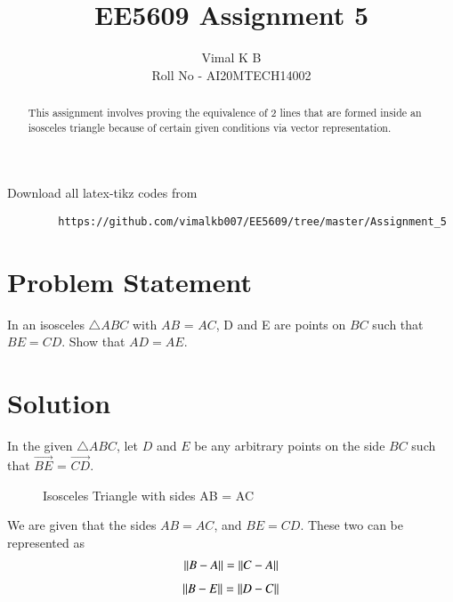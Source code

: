 \documentclass[journal,12pt,twocolumn]{IEEEtran}
\begin{document}
	
	
	\title{EE5609 Assignment 5}
	\author{Vimal K B \\Roll No - AI20MTECH14002}
	
	\maketitle
	\newpage
	\bigskip
	
	\renewcommand{\thefigure}{\theenumi}
	\renewcommand{\thetable}{\theenumi}
	
	\begin{abstract}
		This assignment involves proving the equivalence of 2 lines that are formed inside an isosceles triangle because of certain given conditions via vector representation.
	\end{abstract}

	Download all latex-tikz codes from 
	
	\begin{lstlisting}
		https://github.com/vimalkb007/EE5609/tree/master/Assignment_5
	\end{lstlisting}
	
	\section{Problem Statement}
In an isosceles $\triangle ABC$ with $AB$ = $AC$, D and E are points on $BC$ such that $BE = CD$. Show that $AD = AE$. 
	\section{Solution}
	
	In the given  $\triangle ABC$, let $D$ and $E$ be any arbitrary points on the side $BC$ such that $\vec{BE}$ = $\vec{CD}$.
	
	\renewcommand{\thefigure}{1}
	\begin{figure}[!ht] \label{fig:two_triangles}
		\centering
		\resizebox{\columnwidth}{!}{}
		\caption{Isosceles Triangle with sides AB = AC}
	\end{figure}
	We are given that the sides $AB = AC$, and $BE = CD$. These two can be represented as
	\begin{align}\label{eq:fact1}
		\left\lVert B-A\right\rVert = \left\lVert C-A\right\rVert
	\end{align}
	\begin{align}\label{eq:fact2}
		\left\lVert B-E\right\rVert = \left\lVert D-C\right\rVert
	\end{align}
	
\end{document}
